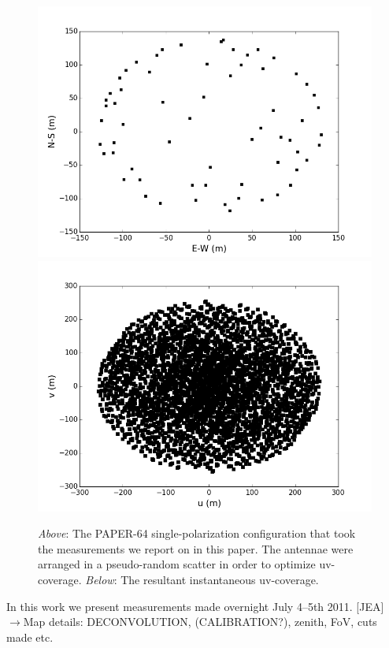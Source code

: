 \documentclass[preprint2,epsf,epsfig,graphics]{emulateapj}
\begin{document}
\begin{figure}
\includegraphics[width=\columnwidth]{psa64imageconfig.png}
\includegraphics[width=\columnwidth]{psa64uvcoverage.png}
\caption{\textit{Above}: The PAPER-64 single-polarization configuration that took the measurements we report on in this paper. The antennae were arranged in a pseudo-random scatter in order to optimize uv-coverage. \textit{Below}: The resultant instantaneous uv-coverage.}
\label{fig:config}
\end{figure}

In this work we present measurements made overnight July 4--5th 2011.
{\color{blue}[JEA] $\rightarrow$}Map details: DECONVOLUTION, (CALIBRATION?), zenith, FoV, cuts made etc.
\end{document}
